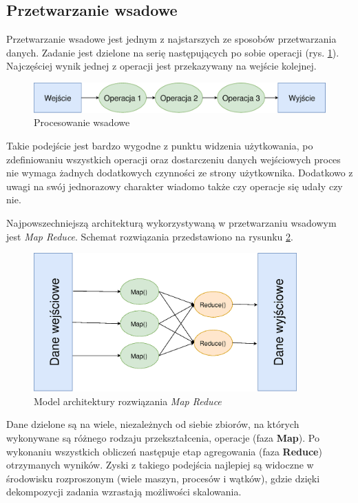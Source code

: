 \subsection{Przetwarzanie wsadowe}
Przetwarzanie wsadowe jest jednym z najstarszych ze sposobów przetwarzania danych.
Zadanie jest dzielone na serię następujących po sobie operacji (rys. \ref{fig:BatchProcessing}).
Najczęściej wynik jednej z operacji jest przekazywany na wejście kolejnej.

\begin{figure}[htbp]
\centering
	\includegraphics[width=1\textwidth]{img/batch}
	\caption{Procesowanie wsadowe}
  \label{fig:BatchProcessing}
\end{figure}
Takie podejście jest bardzo wygodne z punktu widzenia użytkowania,
po zdefiniowaniu wszystkich operacji oraz dostarczeniu danych wejściowych
proces nie wymaga żadnych dodatkowych czynności ze strony użytkownika.
Dodatkowo z uwagi na swój jednorazowy charakter wiadomo także czy operacje się udały czy nie.

Najpowszechniejszą architekturą wykorzystywaną w przetwarzaniu wsadowym jest \textit{Map Reduce}.
Schemat rozwiązania przedstawiono na rysunku \ref{fig:MapReduce}.
\begin{figure}[htbp]
\centering
	\includegraphics[width=0.9\textwidth]{img/mr}
	\caption{Model architektury rozwiązania \textit{Map Reduce}}
  \label{fig:MapReduce}
\end{figure}
Dane dzielone są na wiele,
niezależnych od siebie zbiorów,
na których wykonywane są różnego rodzaju przekształcenia,
operacje (faza \textbf{Map}).
Po wykonaniu wszystkich obliczeń następuje etap agregowania (faza \textbf{Reduce}) otrzymanych wyników.
Zyski z takiego podejścia najlepiej są widoczne w środowisku rozproszonym (wiele maszyn, procesów i wątków),
gdzie dzięki dekompozycji zadania wzrastają możliwości skalowania.

